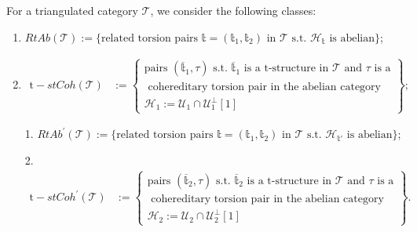 \begin{definition}
  For a triangulated category $\mathcal{T}$, we consider the following classes:
  \begin{enumerate}
    \item $RtAb(\mathcal{T}):=\{\text{related torsion pairs }\mathbb{t}=(\mathbb{t}_1,\mathbb{t}_2)
      \text{ in }\mathcal{T}\text{ s.t. }\mathcal{H}_\mathbb{t}\text{ is abelian}\}$;
    \item
      \begin{align*}
        \mathrm{t-}stCoh(\mathcal{T}) &:=
        \left\{
        \begin{array}{c}
          \text{pairs }(\overline{\mathbb{t}}_1,\tau)\text{ s.t. }
          \overline{\mathbb{t}}_1\text{ is a t-structure in }\mathcal{T}\text{ and }
          \tau\text{ is a}\\
          \text{ cohereditary torsion pair in the abelian category } \\
          \mathcal{H}_1:=\mathcal{U}_1\cap\mathcal{U}_1^\perp[1]
        \end{array}
        \right\};
      \end{align*}
    \item[1\rlap{$^\prime$}.] $RtAb^\prime(\mathcal{T}):=\{\text{related torsion pairs }\mathbb{t}=(\mathbb{t}_1,\mathbb{t}_2)
      \text{ in }\mathcal{T}\text{ s.t. }\mathcal{H}_{\mathbb{t}'}\text{ is abelian}\}$;
    \item[2\rlap{$^\prime$}.]
      \begin{align*}
        \mathrm{t-}stCoh^\prime(\mathcal{T}) &:=
        \left\{
        \begin{array}{c}
          \text{pairs }(\overline{\mathbb{t}}_2,\tau)\text{ s.t. }
          \overline{\mathbb{t}}_2\text{ is a t-structure in }\mathcal{T}\text{ and }
          \tau\text{ is a}\\
          \text{ cohereditary torsion pair in the abelian category } \\
          \mathcal{H}_2:=\mathcal{U}_2\cap\mathcal{U}_2^\perp[1]
        \end{array}
        \right\}.
      \end{align*}
  \end{enumerate}
\end{definition}


